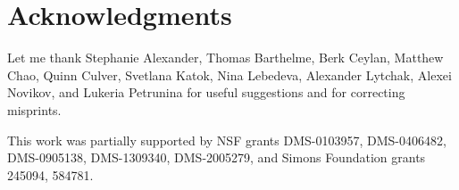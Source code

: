 \section{Acknowledgments}

{\sloppy

Let me thank 
Stephanie Alexander,
Thomas Barthelme,
Berk Ceylan,
Matthew Chao, 
Quinn Culver,
Svetlana Katok, 
Nina Lebedeva,
Alexander Lytchak,
Alexei Novikov,
and Lukeria Petrunina
for useful suggestions and for correcting misprints.

This work was partially supported by
NSF grants
DMS-0103957,
DMS-0406482,
DMS-0905138,
DMS-1309340,
DMS-2005279,
and Simons Foundation grants 
245094, 584781.

}
